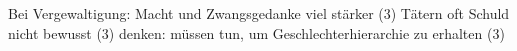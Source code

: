 Bei Vergewaltigung: Macht und Zwangsgedanke viel stärker (3)
Tätern oft Schuld nicht bewusst (3)
denken: müssen tun, um Geschlechterhierarchie zu erhalten (3)







